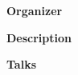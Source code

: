 \begin{center}
{\LARGE \bf }
\end{center}
\bigskip

{\bf Organizer}

\medskip

\bigskip

{\bf Description}
\medskip

\bigskip
{\bf Talks}
\medskip

\begin{description}
\item[] \ \\
  \\
  {\bf } 
\item[] \ \\
  \\
  {\bf } 
\item[] \ \\
  \\
  {\bf } 
\item[] \ \\
  \\
  {\bf } 
\item[] \ \\
  \\
  {\bf } 
\item[] \ \\
  \\
  {\bf } 
\item[] \ \\
  \\
  {\bf } 
\item[] \ \\
  \\
  {\bf } 
\item[] \ \\
  \\
  {\bf } 
\item[] \ \\
  \\
  {\bf } 
\item[] \ \\
  \\
  {\bf } 
\item[] \ \\
  \\
  {\bf } 
\item[] \ \\
  \\
  {\bf } 
\item[] \ \\
  \\

\end{description}

